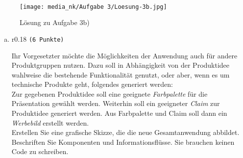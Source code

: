 \documentclass[12pt, ngerman]{AssignmentClass}
\begin{document}
    \begin{answerbox}
		\noindent
		\fbox{\parbox[c]{\textwidth}{
				\vspace{6cm}
				\hspace{\textwidth}
		}}\\
	\end{answerbox}

    \begin{figure}[h]
        \centering
        \texttt{[image: media\_nk/Aufgabe 3/Loesung-3b.jpg]}
        \caption{Lösung zu Aufgabe 3b)}
        \label{fig:Loesung_3a}
    \end{figure}

    
    \begin{enumerate}[c)]
		\item 
			\begin{minipage}[t]{\linewidth}
				\vspace{-0.61em}
				\begin{wrapfigure}[2]{r}{0.18\linewidth} 
					\raggedleft
					\texttt{(6 Punkte)}
				\end{wrapfigure}
                Ihr Vorgesetzter möchte die Möglichkeiten der Anwendung auch für andere Produktgruppen nutzen. Dazu soll in Abhängigkeit von der Produktidee wahlweise die bestehende Funktionalität genutzt, oder aber, wenn es um technische Produkte geht, folgendes generiert werden:\\
                Zur gegebenen Produktidee soll eine geeignete \textit{Farbpalette} für die Präsentation gewählt werden. Weiterhin soll ein geeigneter \textit{Claim} zur Produktidee generiert werden. Aus Farbpalette und Claim soll dann ein \textit{Werbebild} erstellt werden.\\
                Erstellen Sie eine grafische Skizze, die die neue Gesamtanwendung abbildet. Beschriften Sie Komponenten und Informationsflüsse. Sie brauchen keinen Code zu schreiben.
			\end{minipage}
	\end{enumerate}
 
	\begin{solution}
		\noindent
		\\
	\end{solution}
\end{document}
